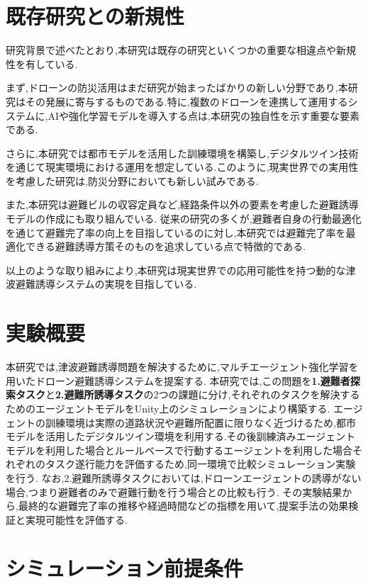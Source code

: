\section{既存研究との新規性}  
研究背景で述べたとおり,本研究は既存の研究といくつかの重要な相違点や新規性を有している.

まず,ドローンの防災活用はまだ研究が始まったばかりの新しい分野であり,本研究はその発展に寄与するものである.特に,複数のドローンを連携して運用するシステムに,AIや強化学習モデルを導入する点は,本研究の独自性を示す重要な要素である.

さらに,本研究では都市モデルを活用した訓練環境を構築し,デジタルツイン技術を通じて現実環境における運用を想定している.このように,現実世界での実用性を考慮した研究は,防災分野においても新しい試みである.

また,本研究は避難ビルの収容定員など,経路条件以外の要素を考慮した避難誘導モデルの作成にも取り組んでいる.
従来の研究の多くが,避難者自身の行動最適化を通じて避難完了率の向上を目指しているのに対し,本研究では避難完了率を最適化できる避難誘導方策そのものを追求している点で特徴的である.

以上のような取り組みにより,本研究は現実世界での応用可能性を持つ動的な津波避難誘導システムの実現を目指している.

\section{実験概要}
本研究では,津波避難誘導問題を解決するために,マルチエージェント強化学習を用いたドローン避難誘導システムを提案する.
本研究では,この問題を\textbf{1.避難者探索タスク}と\textbf{2.避難所誘導タスク}の2つの課題に分け,それぞれのタスクを解決するためのエージェントモデルをUnity上のシミュレーションにより構築する.
エージェントの訓練環境は実際の道路状況や避難所配置に限りなく近づけるため,都市モデルを活用したデジタルツイン環境を利用する.その後訓練済みエージェントモデルを利用した場合とルールベースで行動するエージェントを利用した場合それぞれのタスク遂行能力を評価するため,同一環境で比較シミュレーション実験を行う.
なお,2.避難所誘導タスクにおいては,ドローンエージェントの誘導がない場合,つまり避難者のみで避難行動を行う場合との比較も行う.
その実験結果から,最終的な避難完了率の推移や経過時間などの指標を用いて,提案手法の効果検証と実現可能性を評価する.

\section{シミュレーション前提条件}
